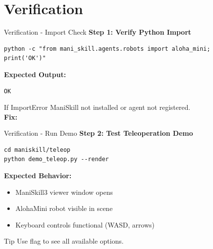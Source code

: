 \documentclass[aspectratio=169]{beamer}
\begin{document}
\section{Verification}

\begin{frame}[fragile]{Verification - Import Check}
\textbf{Step 1: Verify Python Import}

\vspace{0.3cm}

\begin{lstlisting}
python -c "from mani_skill.agents.robots import aloha_mini; print('OK')"
\end{lstlisting}

\vspace{0.5cm}

\textbf{Expected Output:}
\begin{lstlisting}[basicstyle=\ttfamily\small,numbers=none]
OK
\end{lstlisting}

\vspace{0.5cm}

\begin{block}{If ImportError}
ManiSkill not installed or agent not registered.\\
\textbf{Fix:} 
\end{block}
\end{frame}

\begin{frame}[fragile]{Verification - Run Demo}
\textbf{Step 2: Test Teleoperation Demo}

\vspace{0.3cm}

\begin{lstlisting}
cd maniskill/teleop
python demo_teleop.py --render
\end{lstlisting}

\vspace{0.5cm}

\textbf{Expected Behavior:}
\begin{itemize}
    \item ManiSkill3 viewer window opens
    \item AlohaMini robot visible in scene
    \item Keyboard controls functional (WASD, arrows)
\end{itemize}

\vspace{0.3cm}

\begin{block}{Tip}
Use  flag to see all available options.
\end{block}
\end{frame}
\end{document}
